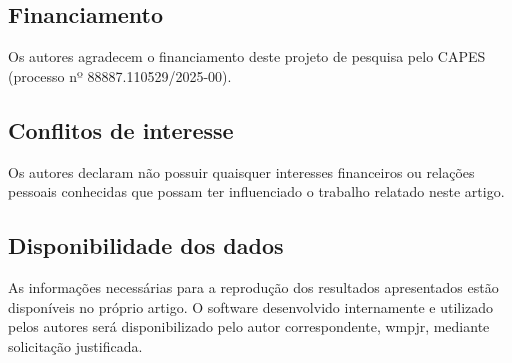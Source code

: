 \subsection*{Financiamento}
Os autores agradecem o financiamento deste projeto de pesquisa pelo CAPES (processo nº 88887.110529/2025-00).

\subsection*{Conflitos de interesse}
Os autores declaram não possuir quaisquer interesses financeiros ou relações pessoais conhecidas que possam ter influenciado o trabalho relatado neste artigo.

\subsection*{Disponibilidade dos dados}
As informações necessárias para a reprodução dos resultados apresentados estão disponíveis no próprio artigo. O software desenvolvido internamente e utilizado pelos autores será disponibilizado pelo autor correspondente, wmpjr, mediante solicitação justificada.





